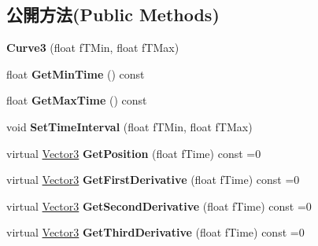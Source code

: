 \subsection*{公開方法(Public Methods)}
\begin{DoxyCompactItemize}
\item 
{\bfseries Curve3} (float f\+T\+Min, float f\+T\+Max)\hypertarget{class_magnum_1_1_curve3_aef894789eb597c659acb2384031010bc}{}\label{class_magnum_1_1_curve3_aef894789eb597c659acb2384031010bc}

\item 
float {\bfseries Get\+Min\+Time} () const \hypertarget{class_magnum_1_1_curve3_ae543f31b40392973cc0c1b69d6a1e310}{}\label{class_magnum_1_1_curve3_ae543f31b40392973cc0c1b69d6a1e310}

\item 
float {\bfseries Get\+Max\+Time} () const \hypertarget{class_magnum_1_1_curve3_a730c5abb2f994c2524fb3b9653dcc824}{}\label{class_magnum_1_1_curve3_a730c5abb2f994c2524fb3b9653dcc824}

\item 
void {\bfseries Set\+Time\+Interval} (float f\+T\+Min, float f\+T\+Max)\hypertarget{class_magnum_1_1_curve3_ae27b9497486a26aeecbe88247820d4a7}{}\label{class_magnum_1_1_curve3_ae27b9497486a26aeecbe88247820d4a7}

\item 
virtual \hyperlink{class_magnum_1_1_vector3}{Vector3} {\bfseries Get\+Position} (float f\+Time) const  =0\hypertarget{class_magnum_1_1_curve3_a86145b7b1514d3694f6cfe93f6436a87}{}\label{class_magnum_1_1_curve3_a86145b7b1514d3694f6cfe93f6436a87}

\item 
virtual \hyperlink{class_magnum_1_1_vector3}{Vector3} {\bfseries Get\+First\+Derivative} (float f\+Time) const  =0\hypertarget{class_magnum_1_1_curve3_a5b8bf72a31c76da2ece6e30435cc824c}{}\label{class_magnum_1_1_curve3_a5b8bf72a31c76da2ece6e30435cc824c}

\item 
virtual \hyperlink{class_magnum_1_1_vector3}{Vector3} {\bfseries Get\+Second\+Derivative} (float f\+Time) const  =0\hypertarget{class_magnum_1_1_curve3_a4a460b42b6597b2948167cd090bdaa39}{}\label{class_magnum_1_1_curve3_a4a460b42b6597b2948167cd090bdaa39}

\item 
virtual \hyperlink{class_magnum_1_1_vector3}{Vector3} {\bfseries Get\+Third\+Derivative} (float f\+Time) const  =0\hypertarget{class_magnum_1_1_curve3_a840d2dc1c26b0d8a8693b796acbc1095}{}\label{class_magnum_1_1_curve3_a840d2dc1c26b0d8a8693b796acbc1095}


\end{DoxyCompactItemize}
